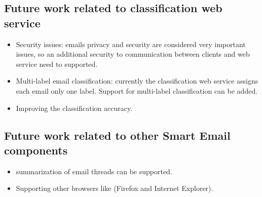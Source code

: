 \subsection{Future work related to classification web service}
\begin{itemize}
    \item Security issues: emails privacy and security are considered very
    important issues, so an additional security to communication between clients and
    web service need to supported.
    \item Multi-label email classification: currently the classification web
    service assigns each email only one label. Support for multi-label
    classification can be added.
    \item Improving the classification accuracy.
\end{itemize}

\subsection{Future work related to other Smart Email components}
\begin{itemize}
    \item summarization of email threads can be supported.
    \item Supporting other browsers like (Firefox and Internet Explorer).
\end{itemize}


